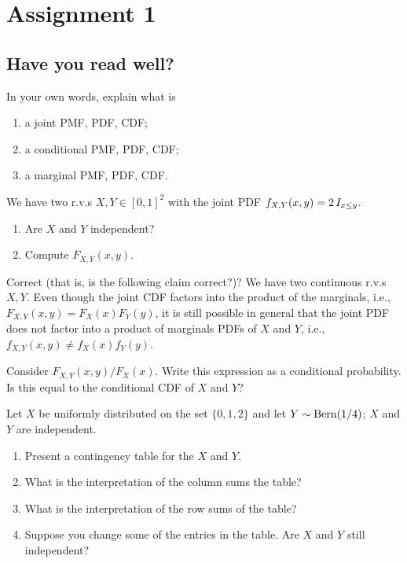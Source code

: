 \documentclass[assignments]{subfiles}
\begin{document}
\section{Assignment 1}
\label{sec:org9cbca82}


\subsection{Have you read well?}
\label{sec:have-you-read}


\begin{exercise}
In your own words, explain what is
\begin{enumerate}
\item a joint PMF, PDF, CDF;
\item a conditional PMF, PDF, CDF;
\item a marginal PMF, PDF, CDF.
\end{enumerate}
\end{exercise}

\begin{exercise}
We have two r.v.s $X, Y \in [0,1]^{2}$ with the joint PDF $f_{X,Y}(x,y) = 2 \,I_{x\leq y}$.
\begin{enumerate}
\item Are $X$ and $Y$ independent?
\item Compute $F_{X,Y}(x,y)$.
\end{enumerate}
\end{exercise}

\begin{exercise}
Correct (that is, is the following claim correct?)?
We have two continuous r.v.s $X, Y$.
Even though the joint CDF factors into the product of the marginals, i.e., $F_{X,Y}(x,y) = F_X(x)F_Y(y)$, it is still possible in general that the joint PDF does not factor into a product of marginals PDFs of $X$ and $Y$, i.e., $f_{X,Y}(x,y) \neq f_X(x) f_Y(y)$.
\end{exercise}

\begin{exercise}
Consider $F_{X,Y}(x,y)/F_{X}(x)$. Write this expression as a conditional probability. Is this equal to the conditional CDF of $X$ and $Y$?
\end{exercise}

\begin{exercise}
Let $X$ be uniformly distributed on the set $\{0,1,2\}$ and let $Y \sim \mathrm{Bern}(1/4)$; $X$ and $Y$ are independent.
\begin{enumerate}
\item Present a contingency table for the $X$ and $Y$.
\item What is the interpretation of the column sums the table?
\item What is the interpretation of the row sums of the table? 
\item Suppose you change some of the entries in the table. Are $X$ and $Y$ still independent?
\end{enumerate}
\end{exercise}
\end{document}
